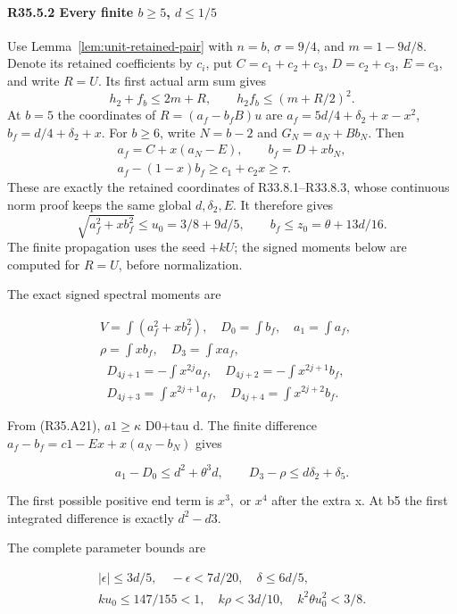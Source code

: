\paragraph{R35.5.2 Every finite $b\ge5$, $d\le1/5$}
Use Lemma~\ref{lem:unit-retained-pair} with $n=b$, $\sigma=9/4$,
and $m=1-9d/8$. Denote its retained coefficients by $c_i$, put
$C=c_1+c_2+c_3$, $D=c_2+c_3$, $E=c_3$, and write $R=U$.
Its first actual arm sum gives
\[
 h_2+f_b\le2m+R,\qquad h_2f_b\le(m+R/2)^2.
\]
At $b=5$ the coordinates of $R=(a_f-b_fB)u$ are
$a_f=5d/4+\delta_2+x-x^2$, $b_f=d/4+\delta_2+x$.
For $b\ge6$, write $N=b-2$ and $G_N=a_N+B b_N$. Then
\[
 \begin{gathered}
 a_f=C+x(a_N-E),\qquad b_f=D+xb_N,\\
 a_f-(1-x)b_f\ge c_1+c_2x\ge\tau.
 \end{gathered}\tag{R35.A21}
\]
These are exactly the retained coordinates of R33.8.1--R33.8.3,
whose continuous norm proof keeps the same global $d,\delta_2,E$.
It therefore gives
\[
 \sqrt{a_f^2+xb_f^2}\le u_0=3/8+9d/5,\qquad
 b_f\le z_0=\theta+13d/16.\tag{R35.A23}
\]
The finite propagation uses the seed $+kU$; the signed moments below
are computed for $R=U$, before normalization.

The exact signed spectral moments are

\[
\begin{gathered}
V=\int(a_f^2+xb_f^2),\quad D_0=\int b_f,\quad a_1=\int a_f,\quad\\
\rho=\int xb_f,\quad D_3=\int xa_f,
\end{gathered}
\]
\[
\begin{gathered}
D_{4j+1}=-\int x^{2j}a_f,\quad D_{4j+2}=-\int x^{2j+1}b_f,\quad\\
D_{4j+3}=\int x^{2j+1}a_f,\quad D_{4j+4}=\int x^{2j+2}b_f.
\end{gathered}\tag{R35.A24}
\]

From (R35.A21), \(a1\ge \kappa\) D0+tau d. The finite difference
\(a_f-b_f=c1-Ex+x(a_N-b_N)\) gives

\[
a_1-D_0\le d^2+\theta^3d,\qquad D_3-\rho\le d\delta_2+\delta_5. \tag{R35.A25}
\]

The first possible positive end term is \(x^3,\allowbreak \) or \(x^4\) after the extra x. At b5 the first integrated difference is exactly \(d^2-d3.\)

The complete parameter bounds are

\[
\begin{gathered}
|\epsilon|\le3d/5,\quad-\epsilon<7d/20,\quad\delta\le6d/5,\quad\\
ku_0\le147/155<1,\quad k\rho<3d/10,\quad k^2\theta u_0^2<3/8.
\end{gathered}\tag{R35.A26}
\]

